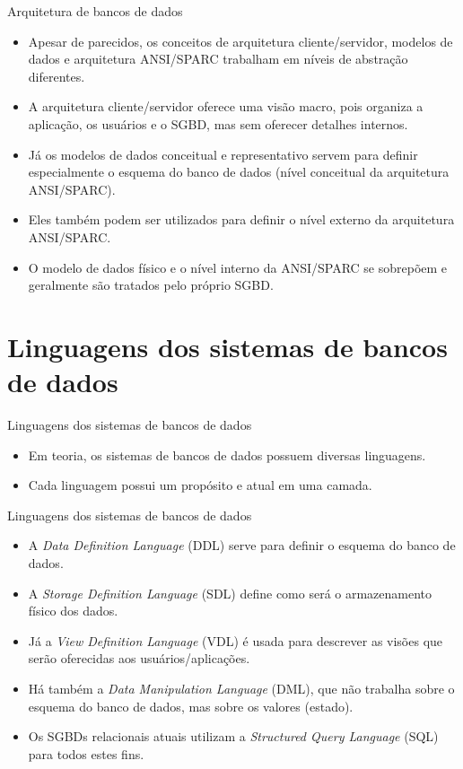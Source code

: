 \documentclass[11pt]{beamer}
\begin{document}
\begin{frame}{Arquitetura de bancos de dados}
    \begin{itemize}
        \item Apesar de parecidos, os conceitos de arquitetura cliente/servidor, modelos de dados e arquitetura ANSI/SPARC trabalham em níveis de abstração diferentes.
        \item A arquitetura cliente/servidor oferece uma visão macro, pois organiza a aplicação, os usuários e o SGBD, mas sem oferecer detalhes internos.
        \item Já os modelos de dados conceitual e representativo servem para definir especialmente o esquema do banco de dados (nível conceitual da arquitetura ANSI/SPARC).
        \item Eles também podem ser utilizados para definir o nível externo da arquitetura ANSI/SPARC.
        \item O modelo de dados físico e o nível interno da ANSI/SPARC se sobrepõem e geralmente são tratados pelo próprio SGBD.
    \end{itemize}
\end{frame}

\section{Linguagens dos sistemas de bancos de dados}

\begin{frame}{Linguagens dos sistemas de bancos de dados}
    \begin{itemize}
        \item Em teoria, os sistemas de bancos de dados possuem diversas linguagens.
        \item Cada linguagem possui um propósito e atual em uma camada.
    \end{itemize}
\end{frame}

\begin{frame}{Linguagens dos sistemas de bancos de dados}
    \begin{itemize}
        \item A \textit{Data Definition Language} (DDL) serve para definir o esquema do banco de dados.
        \item A \textit{Storage Definition Language} (SDL) define como será o armazenamento físico dos dados.
        \item Já a \textit{View Definition Language} (VDL) é usada para descrever as visões que serão oferecidas aos usuários/aplicações.
        \item Há também a \textit{Data Manipulation Language} (DML), que não trabalha sobre o esquema do banco de dados, mas sobre os valores (estado).
        \item Os SGBDs relacionais atuais utilizam a \textit{Structured Query Language} (SQL) para todos estes fins.
    \end{itemize}
\end{frame}
\end{document}
